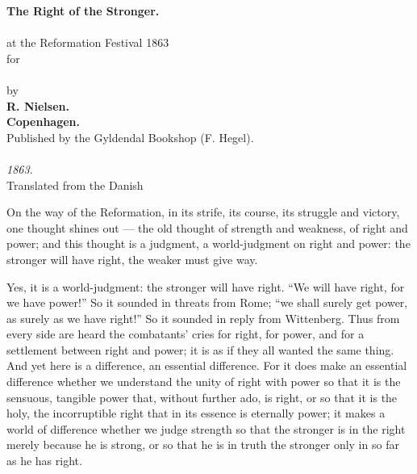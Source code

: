 \documentclass[12pt,a4paper,openany]{book}
\newcommand{\opage}[1]{\marginnote{\footnotesize\textit{[#1]}}}
\begin{document}
\begin{titlepage}
\begin{center}
\vspace*{4em}
{\Huge\textbf{The Right of the Stronger.}}\\[2em]
{\Large{}}\\[1em]
{\large at the Reformation Festival 1863}\\[0.8em]
{\small for}\\[0.8em]
{\large{}}\\[0.8em]
{\small by}\\[0.8em]
{\large\textbf{R. Nielsen.}}\\[8em]
{\small\textbf{Copenhagen.}}\\[0.5em]
{\small Published by the Gyldendal Bookshop (F. Hegel).}\\[0.5em]
{\footnotesize{}}\\[0.5em]
\textit{1863.}\\[4em]
{\small Translated from the Danish}
\end{center}
\end{titlepage}

\opage{3}On the way of the Reformation, in its strife, its course,
its struggle and victory, one thought shines out --- the old thought of
strength and weakness, of right and power; and this thought is
a judgment, a world-judgment on right and power: the stronger
will have right, the weaker must give way.

Yes, it is a world-judgment: the stronger will have right.
``We will have right, for we have power!'' So it sounded in threats
from Rome; ``we shall surely get power, as surely as we have right!''
So it sounded in reply from Wittenberg. Thus from every
side are heard the combatants' cries for right, for power, and for
a settlement between right and power; it is as if they all wanted the
same thing. And yet here is a difference, an essential difference.
For it does make an essential difference whether we understand
the unity of right with power so that it is the sensuous,
tangible power that, without further ado, is right, or
so that it is the holy, the incorruptible right that in
its essence is eternally power; it makes a world of difference whether
we judge strength so that the stronger is in the right
merely because he is strong, or so that he is in truth
the stronger only in so far as he has right.
\end{document}
